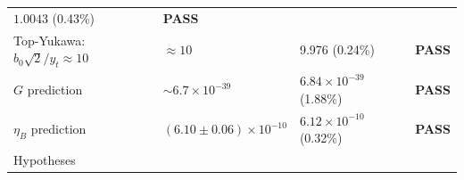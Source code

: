 \documentclass[
  11pt,
]{article}
\begin{document}
\begin{longtable}[]{@{}llll@{}}
\begin{minipage}[t]{0.22\columnwidth}
\(1.0043\) (0.43\%)\strut
\end{minipage} & \begin{minipage}[t]{0.22\columnwidth}\raggedright
\textbf{PASS}\strut
\end{minipage}\tabularnewline
\begin{minipage}[t]{0.22\columnwidth}\raggedright
Top-Yukawa: \(b_0\sqrt{2}/y_t \approx 10\)\strut
\end{minipage} & \begin{minipage}[t]{0.22\columnwidth}\raggedright
\(\approx 10\)\strut
\end{minipage} & \begin{minipage}[t]{0.22\columnwidth}\raggedright
9.976 (0.24\%)\strut
\end{minipage} & \begin{minipage}[t]{0.22\columnwidth}\raggedright
\textbf{PASS}\strut
\end{minipage}\tabularnewline
\begin{minipage}[t]{0.22\columnwidth}\raggedright
\(G\) prediction\strut
\end{minipage} & \begin{minipage}[t]{0.22\columnwidth}\raggedright
\(\sim 6.7 \times 10^{-39}\)\strut
\end{minipage} & \begin{minipage}[t]{0.22\columnwidth}\raggedright
\(6.84 \times 10^{-39}\) (1.88\%)\strut
\end{minipage} & \begin{minipage}[t]{0.22\columnwidth}\raggedright
\textbf{PASS}\strut
\end{minipage}\tabularnewline
\begin{minipage}[t]{0.22\columnwidth}\raggedright
\(\eta_B\) prediction\strut
\end{minipage} & \begin{minipage}[t]{0.22\columnwidth}\raggedright
\((6.10 \pm 0.06) \times 10^{-10}\)\strut
\end{minipage} & \begin{minipage}[t]{0.22\columnwidth}\raggedright
\(6.12 \times 10^{-10}\) (0.32\%)\strut
\end{minipage} & \begin{minipage}[t]{0.22\columnwidth}\raggedright
\textbf{PASS}\strut
\end{minipage}\tabularnewline
\begin{minipage}[t]{0.22\columnwidth}\raggedright
Hypotheses\strut
\end{minipage} & \begin{minipage}[t]{0.22\columnwidth}\raggedright

\end{minipage}
\end{longtable}
\end{document}
